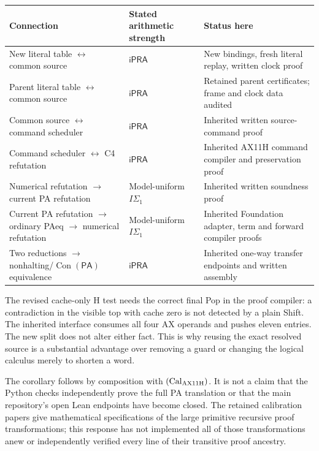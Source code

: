 \documentclass[10pt,a4paper]{article}
\newcommand{\iPRA}{\ensuremath{\mathsf{iPRA}}}
\newcommand{\PA}{\ensuremath{\mathsf{PA}}}
\newcommand{\Con}{\operatorname{Con}}
\theoremstyle{definition}
\begin{document}
\begin{center}\small
\begin{tabularx}{\textwidth}{@{}>{\raggedright\arraybackslash}X>{\raggedright\arraybackslash}p{}>{\raggedright\arraybackslash}p{}@{}}
\toprule Connection & Stated arithmetic strength & Status here\\\midrule
New literal table $\leftrightarrow$ common source & \iPRA & New bindings,
fresh literal replay, written clock proof\\
Parent literal table $\leftrightarrow$ common source & \iPRA & Retained
parent certificates; frame and clock data audited\\
Common source $\leftrightarrow$ command scheduler & \iPRA & Inherited written
source-command proof\\
Command scheduler $\leftrightarrow$ C4 refutation & \iPRA & Inherited AX11H
command compiler and preservation proof\\
Numerical refutation $\to$ current PA refutation & Model-uniform $I\Sigma_1$
& Inherited written soundness proof\\
Current PA refutation $\to$ ordinary PAeq $\to$ numerical refutation &
Model-uniform $I\Sigma_1$ & Inherited Foundation adapter, term and forward
compiler proofs\\
Two reductions $\to$ nonhalting/$\Con(\PA)$ equivalence & \iPRA & Inherited
one-way transfer endpoints and written assembly\\
\bottomrule
\end{tabularx}
\end{center}

The revised cache-only H test needs the correct final Pop in the proof
compiler: a contradiction in the visible top with cache zero is not
detected by a plain Shift. The inherited interface consumes all four AX
operands and pushes eleven entries. The new split does not alter either
fact. This is why reusing the exact resolved source is a substantial
advantage over removing a guard or changing the logical calculus merely
to shorten a word.

The corollary follows by composition with
$(\mathrm{Cal}_{\rm AX11H})$. It is not a claim that the Python checks
independently prove the full PA translation or that the main repository's
open Lean endpoints have become closed. The retained calibration papers
give mathematical specifications of the large primitive recursive proof
transformations; this response has not implemented all of those
transformations anew or independently verified every line of their
transitive proof ancestry.
\end{document}
